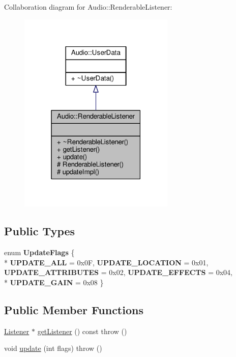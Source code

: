 Collaboration diagram for Audio\+:\+:Renderable\+Listener\+:
\nopagebreak
\begin{figure}[H]
\begin{center}
\leavevmode
\includegraphics[width=211pt]{d4/d63/classAudio_1_1RenderableListener__coll__graph}
\end{center}
\end{figure}
\subsection*{Public Types}
\begin{DoxyCompactItemize}
\item 
enum {\bfseries Update\+Flags} \{ \\*
{\bfseries U\+P\+D\+A\+T\+E\+\_\+\+A\+LL} = 0x0F, 
{\bfseries U\+P\+D\+A\+T\+E\+\_\+\+L\+O\+C\+A\+T\+I\+ON} = 0x01, 
{\bfseries U\+P\+D\+A\+T\+E\+\_\+\+A\+T\+T\+R\+I\+B\+U\+T\+ES} = 0x02, 
{\bfseries U\+P\+D\+A\+T\+E\+\_\+\+E\+F\+F\+E\+C\+TS} = 0x04, 
\\*
{\bfseries U\+P\+D\+A\+T\+E\+\_\+\+G\+A\+IN} = 0x08
 \}\hypertarget{classAudio_1_1RenderableListener_aafe3760e6d6a83e2bcf7608df8188544}{}\label{classAudio_1_1RenderableListener_aafe3760e6d6a83e2bcf7608df8188544}

\end{DoxyCompactItemize}
\subsection*{Public Member Functions}
\begin{DoxyCompactItemize}
\item 
\hyperlink{classAudio_1_1Listener}{Listener} $\ast$ \hyperlink{classAudio_1_1RenderableListener_a4770042edc2947dae87e11f90a557b84}{get\+Listener} () const   throw ()
\item 
void \hyperlink{classAudio_1_1RenderableListener_aed1e3ef1f4a64b6225288b67b0a33cd1}{update} (int flags)  throw ()
\end{DoxyCompactItemize}
